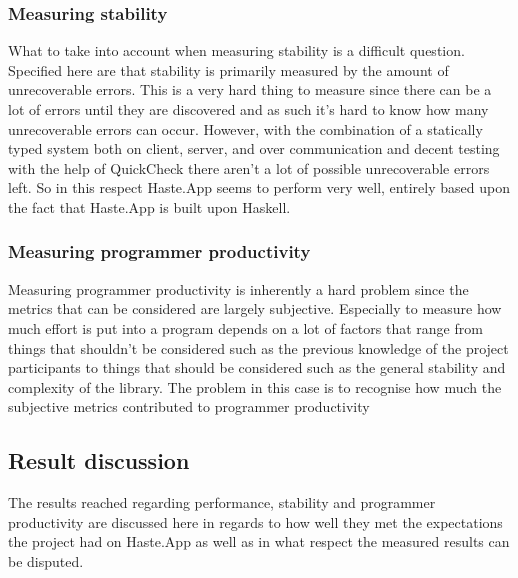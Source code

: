 \documentclass[a4paper]{article}
\begin{document}



\subsubsection{Measuring stability}
What to take into account when measuring stability is a difficult question. Specified here are that stability is primarily measured by the amount of unrecoverable errors. This is a very hard thing to measure since there can be a lot of errors until they are discovered and as such it's hard to know how many unrecoverable errors can occur. However, with the combination of a statically typed system both on client, server, and over communication and decent testing with the help of QuickCheck there aren't a lot of possible unrecoverable errors left. So in this respect Haste.App seems to perform very well, entirely based upon the fact that Haste.App is built upon Haskell.

\subsubsection{Measuring programmer productivity}
Measuring programmer productivity is inherently a hard problem since the metrics that can be considered are largely subjective. Especially to measure how much effort is put into a program depends on a lot of factors that range from things that shouldn't be considered such as the previous knowledge of the project participants to things that should be considered such as the general stability and complexity of the library. The problem in this case is to recognise how much the subjective metrics contributed to programmer productivity 


\subsection{Result discussion}
The results reached regarding performance, stability and programmer productivity are discussed here in regards to how well they met the expectations the project had on Haste.App as well as in what respect the measured results can be disputed. 
\end{document}
